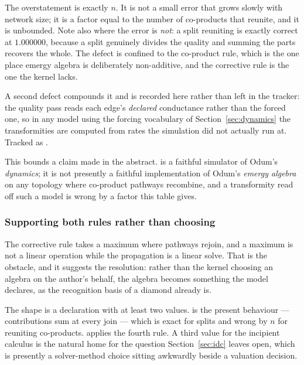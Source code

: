 \documentclass[11pt,a4paper]{article}
\begin{document}
The overstatement is exactly $n$. It is not a small error that grows slowly with network size; it is a factor equal to the number of co-products that reunite, and it is unbounded. Note also where the error is \emph{not}: a split reuniting is exactly correct at $1.000000$, because a split genuinely divides the quality and summing the parts recovers the whole. The defect is confined to the co-product rule, which is the one place emergy algebra is deliberately non-additive, and the corrective rule is the one the kernel lacks.

A second defect compounds it and is recorded here rather than left in the tracker: the quality pass reads each edge's \emph{declared} conductance rather than the forced one, so in any model using the forcing vocabulary of Section~\ref{sec:dynamics} the transformities are computed from rates the simulation did not actually run at. Tracked as .

This bounds a claim made in the abstract. \gssk{} is a faithful simulator of Odum's \emph{dynamics}; it is not presently a faithful implementation of Odum's \emph{emergy algebra} on any topology where co-product pathways recombine, and a transformity read off such a model is wrong by a factor this table gives.

\subsubsection*{Supporting both rules rather than choosing}

The corrective rule takes a maximum where pathways rejoin, and a maximum is not a linear operation while the propagation is a linear solve. That is the obstacle, and it suggests the resolution: rather than the kernel choosing an algebra on the author's behalf, the algebra becomes something the model declares, as the recognition basis of a diamond already is.

The shape is a  declaration with at least two values.  is the present behaviour --- contributions sum at every join --- which is exact for splits and wrong by $n$ for reuniting co-products.  applies the fourth rule. A third value for the incipient calculus is the natural home for the question Section~\ref{sec:idc} leaves open, which is presently a solver-method choice sitting awkwardly beside a valuation decision.
\end{document}
